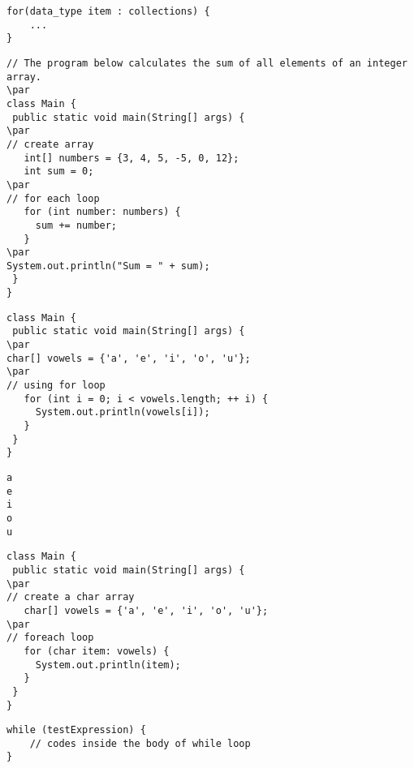 \documentclass{book}
\def\lthtmlcheckvsize{\ifdim\ht\sizebox<\vsize 
  \ifdim\wd\sizebox<\hsize\expandafter\hfill\fi \expandafter\vfill
  \else\expandafter\vss\fi}%
\begin{document}
{\newpage\clearpage
{}%
\begin{lstlisting}
for(data_type item : collections) {
    ...
}
\end{lstlisting}%
\lthtmlfigureZ
\lthtmlcheckvsize\clearpage}

{\newpage\clearpage
{}%
\begin{lstlisting}
// The program below calculates the sum of all elements of an integer array.
\par
class Main {
 public static void main(String[] args) {
\par
// create array
   int[] numbers = {3, 4, 5, -5, 0, 12};
   int sum = 0;
\par
// for each loop 
   for (int number: numbers) {
     sum += number;
   }
\par
System.out.println("Sum = " + sum);
 }
}
\end{lstlisting}%
\lthtmlfigureZ
\lthtmlcheckvsize\clearpage}

{\newpage\clearpage
{}%
\begin{lstlisting}
class Main {
 public static void main(String[] args) {
\par
char[] vowels = {'a', 'e', 'i', 'o', 'u'};
\par
// using for loop
   for (int i = 0; i < vowels.length; ++ i) {
     System.out.println(vowels[i]);
   }
 }
}
\end{lstlisting}%
\lthtmlfigureZ
\lthtmlcheckvsize\clearpage}

{\newpage\clearpage
{}%
\begin{lstlisting}
a
e
i
o
u
\end{lstlisting}%
\lthtmlfigureZ
\lthtmlcheckvsize\clearpage}

{\newpage\clearpage
{}%
\begin{lstlisting}
class Main {
 public static void main(String[] args) {
\par
// create a char array  
   char[] vowels = {'a', 'e', 'i', 'o', 'u'};
\par
// foreach loop
   for (char item: vowels) {
     System.out.println(item);
   }
 }
}
\end{lstlisting}%
\lthtmlfigureZ
\lthtmlcheckvsize\clearpage}

{\newpage\clearpage
{}%
\begin{lstlisting}
while (testExpression) {
    // codes inside the body of while loop
}
\end{lstlisting}%
\lthtmlfigureZ
\lthtmlcheckvsize\clearpage}
\end{document}
